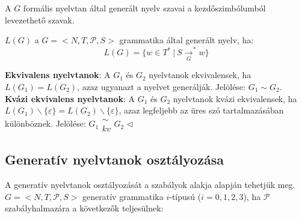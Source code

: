 \documentclass[12pt,margin=0px]{article}
\begin{document}
    \noindent A $G$ formális nyelvtan által generált nyelv szavai a kezdőszimbólumból levezethető szavak.

	\noindent $L(G)$ a $G=\Big<N,T,\mathcal{P},S\Big>$ grammatika által generált nyelv, ha:
	\[
		L(G) = \Big\{w \in T^{*}\ |\ S \xrightarrow[G]{}^{*} w\Big\}
	\]

    {\footnotesize \noindent {\color{blue} \faLightbulbO\ $\triangleright$ } }
    {\footnotesize
    \noindent \textbf{Ekvivalens nyelvtanok}: A $G_1$ és $G_2$ nyelvtanok ekvivalensek, ha $L(G_1) = L(G_2)$, azaz ugyanazt a nyelvet generálják. Jelölése: $G_1 \sim G_2$.\\

    \noindent \textbf{Kvázi ekvivalens nyelvtanok}: A $G_1$ és $G_2$ nyelvtanok kvázi ekvivalensek, ha $L(G_1)\backslash\{\varepsilon\}= L(G_2)\backslash\{\varepsilon\}$, azaz legfeljebb az üres szó tartalmazásában különböznek. Jelölése: $G_1 \begin{array}{c} \sim \\ kv \end{array} G_2$
    $\triangleleft$ \faLightbulbO}

	\subsection*{Generatív nyelvtanok osztályozása}
	
    \noindent A generatív nyelvtanok osztályozását a szabályok alakja alapján tehetjük meg.\\

	\noindent $G = \Big<N,T,\mathcal{P},S\Big>$ generatív grammatika $i$-típusú ($i=0,1,2,3$), ha $\mathcal{P}$ szabályhalmazára a következők teljesülnek:
\end{document}
